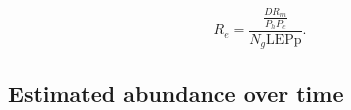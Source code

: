 \documentclass[12pt, oneside]{article}   	%
\begin{document}
\begin{equation}
R_e = \frac{\frac{D R_m}{P_h P_c}}{N_g \text{LEPp}}. \label{EQN_Re}
\end{equation}




\subsection*{Estimated abundance over time} %
\end{document}
